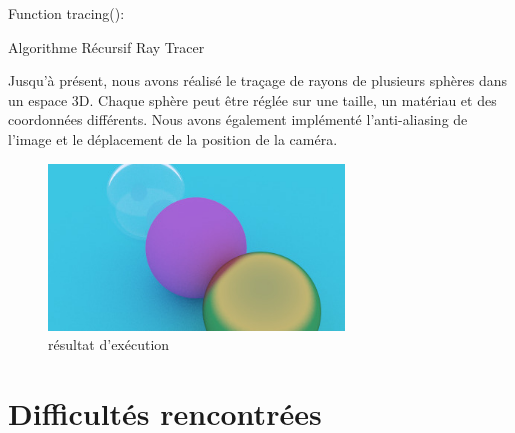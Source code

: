\documentclass{article}
\begin{document}
\begin{algorithm}[H]
  \SetAlgoLined

  Function tracing():
  
    
  \caption{Algorithme Récursif Ray Tracer}
\end{algorithm}

Jusqu'à présent, nous avons réalisé le traçage de rayons de plusieurs sphères dans un espace 3D. Chaque sphère peut être réglée sur une taille, un matériau et des coordonnées différents. Nous avons également implémenté l'anti-aliasing de l'image et le déplacement de la position de la caméra.

\begin{figure}[H] 
\centering 
\includegraphics[width=0.7\textwidth]{resultat.jpg} 
\caption{résultat d'exécution} 
\end{figure}



\section{Difficultés rencontrées}
\end{document}
